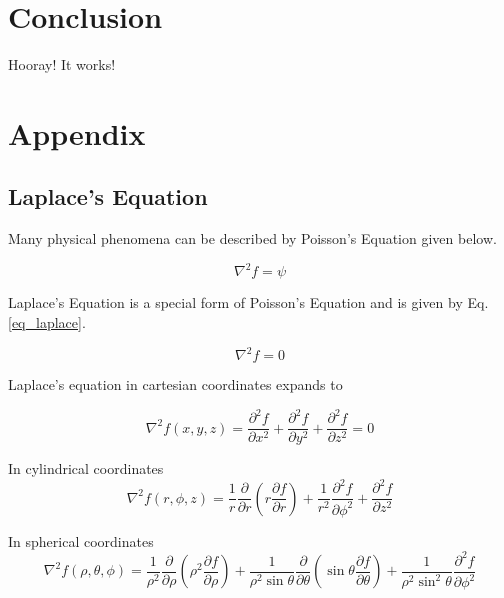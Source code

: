 \documentclass{article}
\numberwithin{equation}{subsection}
\begin{document}
\section{Conclusion}
Hooray! It works!

\section{Appendix}

\subsection{Laplace's Equation} \label{sec_laplace}
Many physical phenomena can be described by Poisson's Equation given below.

\begin{equation} \label{eq_poisson}
\nabla^2 f = \psi
\end{equation}

Laplace's Equation is a special form of Poisson's Equation and is given by Eq. \ref{eq_laplace}.


\begin{equation} \label{eq_laplace}
\nabla^2 f = 0
\end{equation}

Laplace's equation in cartesian coordinates expands to

\begin{equation} \label{eq_laplace_cartesian}
\nabla^2 f(x, y, z) = \frac{\partial^2 f}{\partial x^2} + \frac{\partial^2 f}{\partial y^2} + \frac{\partial^2 f}{\partial z^2} = 0
\end{equation}

In cylindrical coordinates
\begin{equation} \label{eq_laplace_cylindrical}
\nabla^2 f(r, \phi, z) = \frac{1}{r} \frac{\partial}{\partial r}\left( r \frac{\partial f}{\partial r}\right) + \frac{1}{r^2}\frac{\partial^2 f}{\partial \phi^2} + \frac{\partial^2 f}{\partial z^2}
\end{equation}

In spherical coordinates
\begin{equation} \label{eq_laplace_spherical}
\nabla^2 f(\rho, \theta, \phi) = \frac{1}{\rho^2}\frac{\partial}{\partial \rho} \left( \rho^2 \frac{\partial f}{\partial \rho}\right) + \frac{1}{\rho^2 \sin \theta}\frac{\partial}{\partial \theta}\left( \sin \theta \frac{\partial f}{\partial \theta}\right) + \frac{1}{\rho^2 \sin^2 \theta} \frac{\partial^2 f}{\partial \phi^2}
\end{equation}
\end{document}
